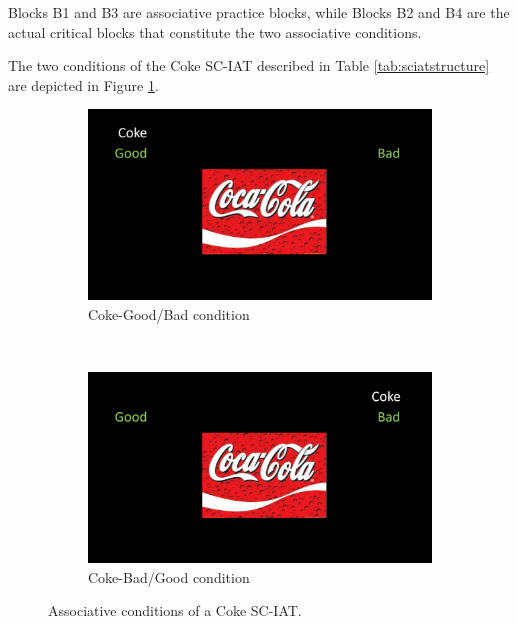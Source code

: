 \documentclass[12pt]{book}
\begin{document}
Blocks B1 and B3 are associative practice blocks, while Blocks B2 and B4 are the actual critical blocks that constitute the two associative conditions. 

The two conditions of the Coke SC-IAT described in Table \ref{tab:sciatstructure} are depicted in Figure \ref{fig:SCIAT}. 

\begin{figure}[h!]
	\centering
	\begin{subfigure}[b]{0.4\linewidth}
		\includegraphics[width=\linewidth]{sccokegood.png}
		\caption{Coke-Good/Bad condition}
	\end{subfigure}
	~ %
	\begin{subfigure}[b]{0.4\linewidth}
		\includegraphics[width=\linewidth]{sccokebad.png}
		\caption{Coke-Bad/Good condition}
	\end{subfigure}
	\caption{\label{fig:SCIAT} Associative conditions of a Coke SC-IAT.}
\end{figure}
\end{document}
